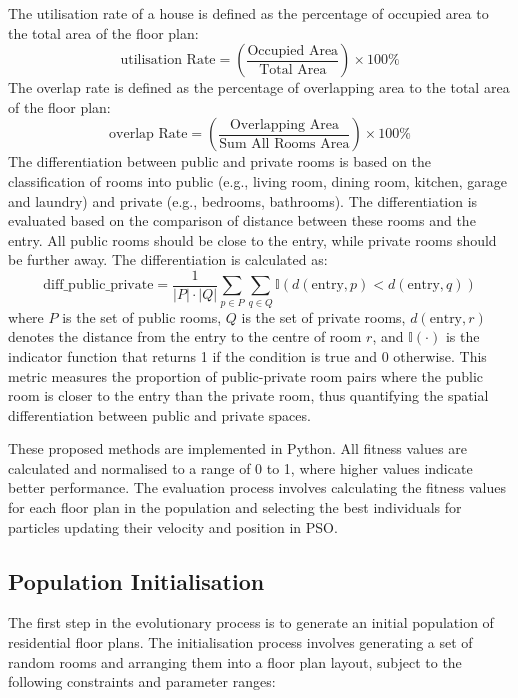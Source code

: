 \documentclass[]{article}
\begin{document}
The utilisation rate of a house is defined as the percentage of occupied area to the total area of the floor plan:
\begin{equation*}
    \text{utilisation Rate} = \left( \frac{\text{Occupied Area}}{\text{Total Area}} \right) \times 100\%
\end{equation*}
The overlap rate is defined as the percentage of overlapping area to the total area of the floor plan:
\begin{equation*}
    \text{overlap Rate} = \left( \frac{\text{Overlapping Area}}{\text{Sum All Rooms Area}} \right) \times 100\%
\end{equation*}
The differentiation between public and private rooms is based on the classification of rooms into public (e.g., living room, dining room, kitchen, garage and laundry) and private (e.g., bedrooms, bathrooms). The differentiation is evaluated based on the comparison of distance between these rooms and the entry. All public rooms should be close to the entry, while private rooms should be further away. The differentiation is calculated as:
\begin{equation*}
    \text{diff\_public\_private} = \frac{1}{|P| \cdot |Q|} \sum_{p \in P} \sum_{q \in Q} \mathbb{I}\left( d(\text{entry}, p) < d(\text{entry}, q) \right)
\end{equation*}
where $P$ is the set of public rooms, $Q$ is the set of private rooms, $d(\text{entry}, r)$ denotes the distance from the entry to the centre of room $r$, and $\mathbb{I}(\cdot)$ is the indicator function that returns 1 if the condition is true and 0 otherwise. This metric measures the proportion of public-private room pairs where the public room is closer to the entry than the private room, thus quantifying the spatial differentiation between public and private spaces.

These proposed methods are implemented in Python. All fitness values are calculated and normalised to a range of 0 to 1, where higher values indicate better performance. The evaluation process involves calculating the fitness values for each floor plan in the population and selecting the best individuals for particles updating their velocity and position in PSO.

\subsection{Population Initialisation}
The first step in the evolutionary process is to generate an initial population of residential floor plans. The initialisation process involves generating a set of random rooms and arranging them into a floor plan layout, subject to the following constraints and parameter ranges:
\end{document}
